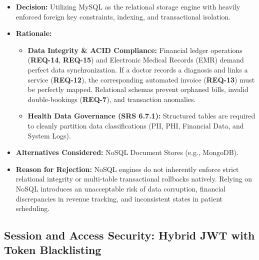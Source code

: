 \begin{itemize}
	\item \textbf{Decision:} Utilizing MySQL as the relational storage engine with heavily enforced foreign key constraints, indexing, and transactional isolation.
	\item \textbf{Rationale:} 
	\begin{itemize}
		\item \textbf{Data Integrity \& ACID Compliance:} Financial ledger operations (\textbf{REQ-14}, \textbf{REQ-15}) and Electronic Medical Records (EMR) demand perfect data synchronization. If a doctor records a diagnosis and links a service (\textbf{REQ-12}), the corresponding automated invoice (\textbf{REQ-13}) must be perfectly mapped. Relational schemas prevent orphaned bills, invalid double-bookings (\textbf{REQ-7}), and transaction anomalies.
		\item \textbf{Health Data Governance (SRS 6.7.1):} Structured tables are required to cleanly partition data classifications (PII, PHI, Financial Data, and System Logs).
	\end{itemize}
	\item \textbf{Alternatives Considered:} NoSQL Document Stores (e.g., MongoDB).
	\item \textbf{Reason for Rejection:} NoSQL engines do not inherently enforce strict relational integrity or multi-table transactional rollbacks natively. Relying on NoSQL introduces an unacceptable risk of data corruption, financial discrepancies in revenue tracking, and inconsistent states in patient scheduling.
\end{itemize}

\subsection{Session and Access Security: Hybrid JWT with Token Blacklisting}
\label{subsec:rationale_security}

